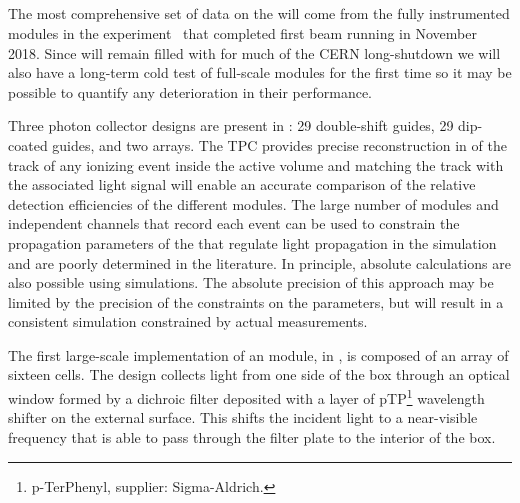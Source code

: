 \subsection{}

The most comprehensive set of data on the  will come from the fully instrumented modules in the  experiment~\cite{Abi:2017aow} that completed first beam running in November \num{2018}. 
Since  will remain filled with \lar for much of the CERN long-shutdown we will also have a long-term cold test of full-scale  modules for the first time so it may be possible to quantify any deterioration in their performance.


Three photon collector designs are present in : \num{29} double-shift guides, \num{29} dip-coated guides, and two  arrays. 
The TPC provides precise reconstruction in \threed of the track of any ionizing event inside the active volume and matching the track with the associated light signal will enable an accurate comparison of the relative detection efficiencies of the different  modules. 
The large number of modules and independent channels that record each event can be used to constrain the propagation parameters of the \lar that regulate  light propagation in the simulation and are poorly determined in the literature. %
In principle, absolute calculations are also possible using  simulations.
The absolute precision of this approach may be limited by the precision of the constraints on the parameters, but will result in a consistent simulation constrained by actual measurements. 

The first large-scale implementation of an  module, in , is composed of an array of sixteen cells.
The  design collects light from one side of the box through an optical window formed by a dichroic filter deposited with a layer of pTP\footnote{p-TerPhenyl, supplier: Sigma-Aldrich\textregistered.}
wavelength shifter on the external surface. This shifts the incident  light to a near-visible frequency that is able to pass through the filter plate to the interior of the box.  

